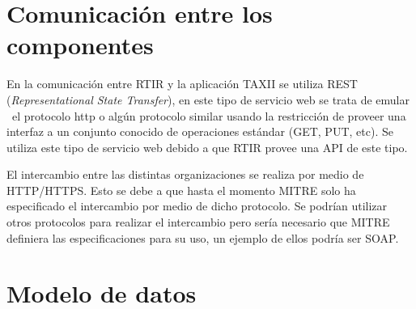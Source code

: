 	\section{Comunicación entre los componentes}
	
	\bigskip
	
	En la comunicación entre RTIR y la aplicación TAXII se utiliza REST (\textit{Representational State
		Transfer}), en este tipo de servicio web se trata de emular \ el protocolo http o algún protocolo similar usando la
		restricción de proveer una interfaz a un conjunto conocido de operaciones estándar (GET, PUT, etc). Se utiliza este
		tipo de servicio web debido a que RTIR provee una API de este tipo.
	
	
	\bigskip
	
	El intercambio entre las distintas organizaciones se realiza por medio de HTTP/HTTPS. Esto se
		debe a que hasta el momento MITRE solo ha especificado el intercambio por medio de dicho protocolo. Se podrían utilizar
		otros protocolos para realizar el intercambio pero sería necesario que MITRE definiera las especificaciones para su
		uso, un ejemplo de ellos podría ser SOAP.

	
	\bigskip
	
	\section{Modelo de datos}
	
